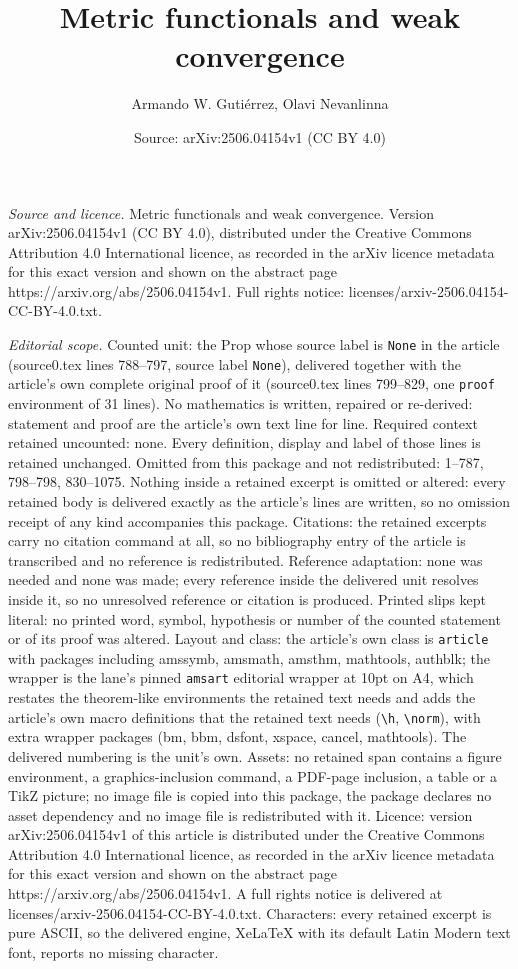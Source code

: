\documentclass[10pt,a4paper]{amsart}
\title[Metric functionals and weak convergence]{Metric functionals and weak convergence}
\author{Armando W. Guti\'errez, Olavi Nevanlinna}
\date{Source: arXiv:2506.04154v1 (CC BY 4.0)}
\begin{document}
\maketitle

\noindent\emph{Source and licence.} Metric functionals and weak convergence. Version arXiv:2506.04154v1 (CC BY 4.0), distributed under the Creative Commons Attribution 4.0 International licence, as recorded in the arXiv licence metadata for this exact version and shown on the abstract page https://arxiv.org/abs/2506.04154v1. Full rights notice: licenses/arxiv-2506.04154-CC-BY-4.0.txt.\par\smallskip

\noindent\textit{Editorial scope.} Counted unit: the Prop whose source label is \texttt{None} in the article (source0.tex lines 788--797, source label \texttt{None}), delivered together with the article's own complete original proof of it (source0.tex lines 799--829, one \texttt{proof} environment of 31 lines). No mathematics is written, repaired or re-derived: statement and proof are the article's own text line for line. Required context retained uncounted: none. Every definition, display and label of those lines is retained unchanged. Omitted from this package and not redistributed: 1--787, 798--798, 830--1075. Nothing inside a retained excerpt is omitted or altered: every retained body is delivered exactly as the article's lines are written, so no omission receipt of any kind accompanies this package. Citations: the retained excerpts carry no citation command at all, so no bibliography entry of the article is transcribed and no reference is redistributed. Reference adaptation: none was needed and none was made; every reference inside the delivered unit resolves inside it, so no unresolved reference or citation is produced. Printed slips kept literal: no printed word, symbol, hypothesis or number of the counted statement or of its proof was altered. Layout and class: the article's own class is \texttt{article} with packages including amssymb, amsmath, amsthm, mathtools, authblk; the wrapper is the lane's pinned \texttt{amsart} editorial wrapper at 10pt on A4, which restates the theorem-like environments the retained text needs and adds the article's own macro definitions that the retained text needs (\texttt{\textbackslash h}, \texttt{\textbackslash norm}), with extra wrapper packages (bm, bbm, dsfont, xspace, cancel, mathtools). The delivered numbering is the unit's own. Assets: no retained span contains a figure environment, a graphics-inclusion command, a PDF-page inclusion, a table or a TikZ picture; no image file is copied into this package, the package declares no asset dependency and no image file is redistributed with it. Licence: version arXiv:2506.04154v1 of this article is distributed under the Creative Commons Attribution 4.0 International licence, as recorded in the arXiv licence metadata for this exact version and shown on the abstract page https://arxiv.org/abs/2506.04154v1. A full rights notice is delivered at licenses/arxiv-2506.04154-CC-BY-4.0.txt. Characters: every retained excerpt is pure ASCII, so the delivered engine, XeLaTeX with its default Latin Modern text font, reports no missing character.
\end{document}
